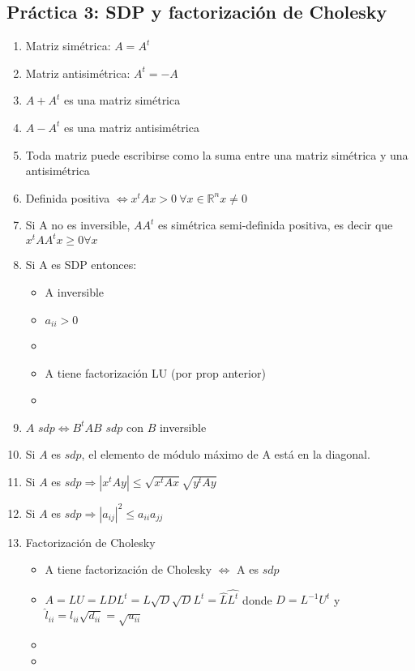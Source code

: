 \subsection*{Práctica 3: SDP y factorización de Cholesky}
\begin{enumerate}
    \item Matriz simétrica: $A=A^t$
    \item Matriz antisimétrica: $A^t=-A$
    \item $A+A^t$ es una matriz simétrica
    \item $A-A^t$ es una matriz antisimétrica
    \item Toda matriz puede escribirse como la suma entre una matriz simétrica y una antisimétrica
    \item Definida positiva $\iff x^tAx>0 \  \forall x \in \mathbb{R}^n x\neq0$
    \item Si A no es inversible, $AA^t$ es simétrica semi-definida positiva, es decir que $x^tAA^tx \geq 0 \forall x $
    \item Si A es SDP entonces:
    \begin{itemize}
        \item A inversible
        \item $a_{ii} > 0$
        \item {}
        \item A tiene factorización LU (por prop anterior)
        \item {}
    \end{itemize}
    \item $A$ $sdp \iff B^tAB$ $sdp$ con $B$ inversible
    \item Si $A$ es $sdp$, el elemento de módulo máximo de A está en la diagonal. 
    \item Si $A$ es $sdp \Rightarrow |x^tAy| \leq \sqrt{x^tAx}\sqrt{y^tAy}$ 
    \item Si $A$ es $sdp \Rightarrow |a_{ij}|^2\leq a_{ii}a_{jj}$
    \item Factorización de Cholesky
    \begin{itemize}
        \item A tiene factorización de Cholesky $\iff$ A es $sdp$
        \item $A = LU = LDL^t = L\sqrt{D}\sqrt{D}L^t = \hat{L}\hat{L^t}$ donde $D = L^{-1}U^t$ y $\hat{l}_{ii} = l_{ii}\sqrt{d_{ii}} = \sqrt{u_{ii}}$
        \item {}
        \item {}
    \end{itemize}
\end{enumerate}

